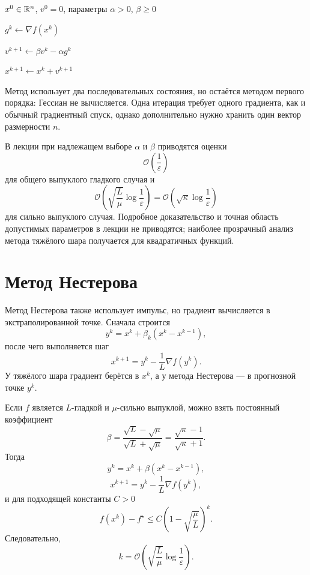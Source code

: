 \begin{algorithm}[H]
\caption{Метод тяжёлого шара}
\label{alg:heavy-ball}
\begin{algorithmic}[1]

\Require
\(x^0\in\mathbb{R}^n\), \(v^0=0\),
параметры \(\alpha>0\), \(\beta\ge0\)


    \State
    \(g^k\gets\nabla f(x^k)\)

    \State
    \(v^{k+1}\gets\beta v^k-\alpha g^k\)

    \State
    \(x^{k+1}\gets x^k+v^{k+1}\)

\EndFor

\end{algorithmic}
\end{algorithm}

Метод использует два последовательных состояния, но остаётся методом
первого порядка: Гессиан не вычисляется. Одна итерация требует одного
градиента, как и обычный градиентный спуск, однако дополнительно нужно
хранить один вектор размерности \(n\).

В лекции при надлежащем выборе \(\alpha\) и \(\beta\) приводятся
оценки
\[
    \mathcal O\!\left(\frac1\varepsilon\right)
\]
для общего выпуклого гладкого случая и
\[
    \mathcal O\!\left(
        \sqrt{\frac L\mu}
        \log\frac1\varepsilon
    \right)
    =
    \mathcal O\!\left(
        \sqrt\kappa
        \log\frac1\varepsilon
    \right)
\]
для сильно выпуклого случая. Подробное доказательство и точная область
допустимых параметров в лекции не приводятся; наиболее прозрачный
анализ метода тяжёлого шара получается для квадратичных функций.

\section{Метод Нестерова}

Метод Нестерова также использует импульс, но градиент вычисляется в
экстраполированной точке. Сначала строится
\[
    y^k
    =
    x^k+\beta_k(x^k-x^{k-1}),
\]
после чего выполняется шаг
\[
    x^{k+1}
    =
    y^k-\frac1L\nabla f(y^k).
\]
У тяжёлого шара градиент берётся в \(x^k\), а у метода Нестерова ---
в прогнозной точке \(y^k\).

Если \(f\) является \(L\)-гладкой и \(\mu\)-сильно выпуклой, можно
взять постоянный коэффициент
\[
    \beta
    =
    \frac{\sqrt L-\sqrt\mu}
         {\sqrt L+\sqrt\mu}
    =
    \frac{\sqrt\kappa-1}
         {\sqrt\kappa+1}.
\]
Тогда
\[
    y^k
    =
    x^k+\beta(x^k-x^{k-1}),
\]
\[
    x^{k+1}
    =
    y^k-\frac1L\nabla f(y^k),
\]
и для подходящей константы \(C>0\)
\[
    f(x^k)-f^\star
    \le
    C
    \left(
        1-\sqrt{\frac\mu L}
    \right)^k.
\]
Следовательно,
\[
    k
    =
    \mathcal O\!\left(
        \sqrt{\frac L\mu}
        \log\frac1\varepsilon
    \right).
\]

